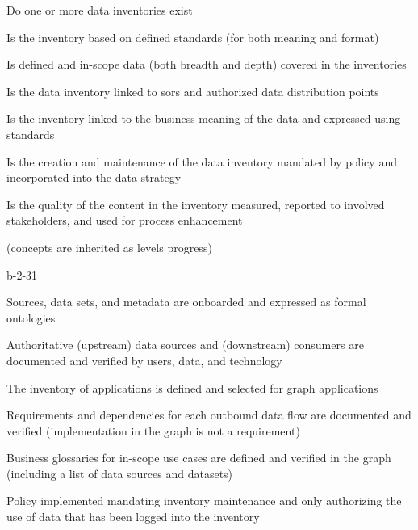 %
%



\begin{maturity-dimensions}

  \item Do one or more data inventories exist
  \item Is the inventory based on defined standards (for both meaning and format)
  \item Is defined and in-scope data (both breadth and depth) covered in the inventories
  \item Is the data inventory linked to \glspl{sor} and authorized data distribution points
  \item Is the inventory linked to the business meaning of the data and expressed using standards
  \item Is the creation and maintenance of the data inventory mandated by policy and incorporated
        into the data strategy
  \item Is the quality of the content in the inventory measured, reported to involved stakeholders,
        and used for process enhancement

\end{maturity-dimensions}

\ekgmmCapabilitySectionLevelsOneFive

(concepts are inherited as levels progress)

\begin{level-assessment}{b-2-3}{1}

  \item Sources, data sets, and metadata are onboarded and expressed as formal ontologies
  \item Authoritative (upstream) data sources and (downstream) consumers are documented and verified by users,
        data, and technology
  \item The inventory of applications is defined and selected for graph applications
  \item Requirements and dependencies for each outbound data flow are documented and verified (implementation in the
        graph is not a requirement)
  \item Business glossaries for in-scope use cases are defined and verified in the graph (including a list of
        data sources and datasets)
  \item Policy implemented mandating inventory maintenance and only authorizing the use of data that has been logged
        into the inventory

\end{level-assessment}


